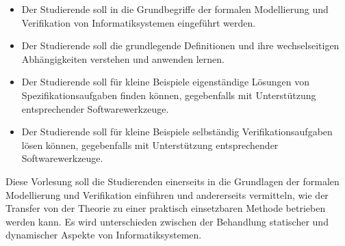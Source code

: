 \begin{module}
\begin{learningoutcomes}
\begin{itemize}\item Der Studierende soll in die Grundbegriffe der formalen Modellierung und Verifikation von Informatiksystemen eingeführt werden.   \item Der Studierende soll die grundlegende Definitionen und ihre wechselseitigen Abhängigkeiten verstehen und anwenden lernen.  \item Der Studierende soll für kleine Beispiele eigenständige Lösungen von Spezifikationsaufgaben finden können, gegebenfalls mit Unterstützung entsprechender Softwarewerkzeuge.  \item Der Studierende soll für kleine Beispiele selbständig Verifikationsaufgaben lösen können, gegebenfalls mit Unterstützung entsprechender Softwarewerkzeuge.  \end{itemize}
\end{learningoutcomes}

\begin{content}
Diese Vorlesung soll die Studierenden einerseits in die Grundlagen der formalen Modellierung und Verifikation einführen und andererseits vermitteln, wie der Transfer von der Theorie zu einer praktisch einsetzbaren Methode betrieben werden kann.\newline
Es wird unterschieden zwischen der Behandlung statischer und dynamischer Aspekte von Informatiksystemen.


\end{content}
\end{module}
